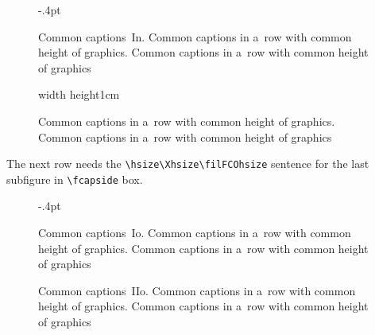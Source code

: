 \documentclass{book}
\begin{document}
\begin{figure}[H]\fboxsep-.4pt
{\begin{floatrow}[2]%
\ffigbox[\FBwidth]{}%
{\begin{subfloatrow}[3]\useFCwidth%
%
\fcapside[\FBwidth]{}{\caption{}%
\label{fig:CHs:WcatIz}%
{\vrule width30pt height2cm}}%
\fcapside[\FBwidth]{}{\caption{}%
\label{fig:CHs:WcatIzz}%
{\vrule width30pt height2.4cm}}
\end{subfloatrow}\caption{Common captions~In.
Common captions in a~row with common height of graphics.
Common captions in a~row with common height of graphics}}%
\ffigbox[\Xhsize]{}%
{\vrule width\hsize
 height1cm\caption{%
Common captions in a~row with common height of graphics.
Common captions in a~row with common height of graphics}}
\end{floatrow}}%
\end{figure}%


The next row needs the \verb|\hsize\Xhsize\filFCOhsize| sentence for the last subfigure in  \verb|\fcapside| box.

\begin{figure}[H]\fboxsep-.4pt
{\begin{floatrow}[2]%
\ffigbox[\FBwidth]{}%
{\begin{subfloatrow}[2]\useFCwidth%
%
\fcapside[\FBwidth]{}{\caption{}%
\label{fig:CHs:WcatIaz}%
{\vrule width30pt height2cm}}
\end{subfloatrow}\caption{Common captions~Io.
Common captions in a~row with common height of graphics.
Common captions in a~row with common height of graphics}}%
\ffigbox[\Xhsize]{}%
{\begin{subfloatrow}[2]\useFCwidth%
%
\hsize\Xhsize\filFCOhsize\fcapside{}{\caption{}%
\label{fig:CHs:WcatIazz}%
{\vrule width\hsize height2cm}}
\end{subfloatrow}\caption{Common captions~IIo.
Common captions in a~row with common height of graphics.
Common captions in a~row with common height of graphics}}
\end{floatrow}}%
\end{figure}%
\end{document}
